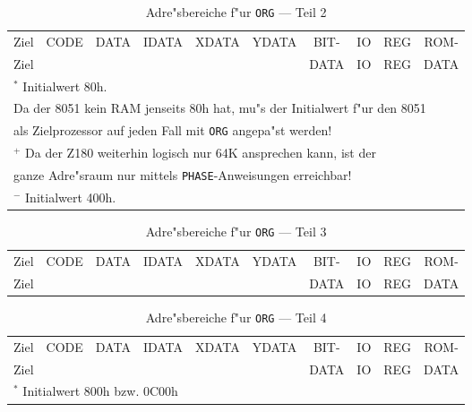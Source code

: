 \documentclass[12pt,a4paper,twoside]{report}
\newcommand{\tty}[1]{{\tt #1}}
\newcommand{\tin}[1]{{\scriptsize #1}}
\begin{document}
\clearpage
\begin{table*}[htbp]
\begin{center}\begin{tabular}{|l|c|c|c|c|c|c|c|c|c|}
\hline
\tin{Ziel} & \tin{CODE} & \tin{DATA} & \tin{IDATA} & \tin{XDATA} & \tin{YDATA} & \tin{BIT-} & \tin{IO} & \tin{REG} & \tin{ROM-} \\
\tin{Ziel} &            &            &             &             &             & \tin{DATA} & \tin{IO} & \tin{REG} & \tin{DATA} \\
\hline
\hline

\hline
\multicolumn{10}{|l|}{$^{*}$ Initialwert 80h. } \\
\multicolumn{10}{|l|}{  Da der 8051 kein RAM jenseits 80h hat, mu"s der Initialwert f"ur den 8051} \\
\multicolumn{10}{|l|}{  als Zielprozessor auf jeden Fall mit \tty{ORG} angepa"st werden!} \\
\hline
\multicolumn{10}{|l|}{$^{+}$ Da der Z180 weiterhin logisch nur 64K ansprechen kann, ist der} \\
\multicolumn{10}{|l|}{ganze Adre"sraum nur mittels \tty{PHASE}-Anweisungen erreichbar!} \\
\hline
\multicolumn{10}{|l|}{$^{-}$ Initialwert 400h. } \\
\hline
\end{tabular}\end{center}
\caption{Adre"sbereiche f"ur \tty{ORG} --- Teil 2\label{TabORG2}}
\end{table*}
\clearpage
\begin{table*}[htbp]
\begin{center}\begin{tabular}{|l|c|c|c|c|c|c|c|c|c|}
\hline
\tin{Ziel} & \tin{CODE} & \tin{DATA} & \tin{IDATA} & \tin{XDATA} & \tin{YDATA} & \tin{BIT-} & \tin{IO} & \tin{REG} & \tin{ROM-} \\
\tin{Ziel} &            &            &             &             &             & \tin{DATA} & \tin{IO} & \tin{REG} & \tin{DATA} \\
\hline
\hline

\hline
\end{tabular}\end{center}
\caption{Adre"sbereiche f"ur \tty{ORG} --- Teil 3\label{TabORG3}}
\end{table*}
\clearpage
\begin{table*}[htbp]
\begin{center}\begin{tabular}{|l|c|c|c|c|c|c|c|c|c|}
\hline
\tin{Ziel} & \tin{CODE} & \tin{DATA} & \tin{IDATA} & \tin{XDATA} & \tin{YDATA} & \tin{BIT-} & \tin{IO} & \tin{REG} & \tin{ROM-} \\
\tin{Ziel} &            &            &             &             &             & \tin{DATA} & \tin{IO} & \tin{REG} & \tin{DATA} \\
\hline
\hline

\hline
\multicolumn{10}{|l|}{$^{*}$ Initialwert 800h bzw. 0C00h} \\
\hline
\end{tabular}\end{center}
\caption{Adre"sbereiche f"ur \tty{ORG} --- Teil 4\label{TabORG4}}
\end{table*}
\end{document}
